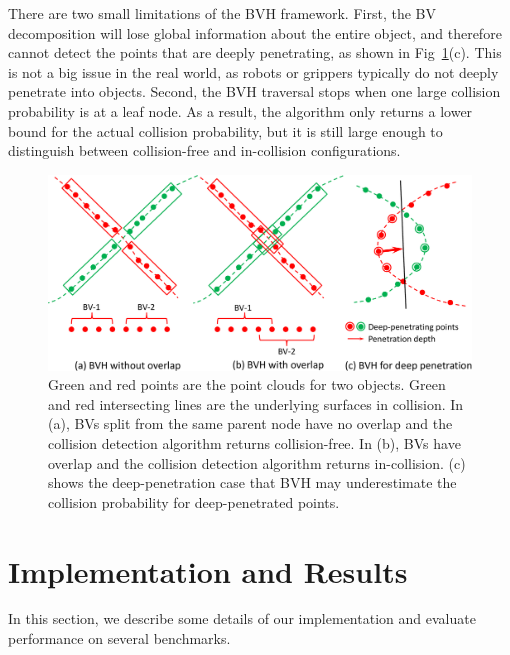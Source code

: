 There are two small limitations of the BVH framework. First, the BV decomposition will lose global information about the entire object, and therefore cannot detect the points that are deeply penetrating, as shown in Fig~\ref{fig:7:bvh_overlap}(c). This is not a big issue in the real world, as robots or grippers typically do not deeply penetrate into objects. Second, the BVH traversal stops when one large collision probability is at a leaf node.
As a result, the algorithm only returns a lower bound for the actual collision probability, but it is still large enough to distinguish between collision-free and in-collision configurations.

\begin{figure}[htb]
  \centering
  \includegraphics[width=0.9\linewidth]{figs/7/bvh_overlap.pdf}
  \caption[BVH acceleration for point-cloud collision]{\label{fig:7:bvh_overlap} Green and red points are the point clouds for two objects. Green and red intersecting lines are the underlying surfaces in collision. In (a), BVs split from the same parent node
  have no overlap and the collision detection algorithm returns collision-free. In (b), BVs have overlap and the collision detection algorithm returns in-collision. (c) shows the deep-penetration case that BVH may underestimate the collision probability for deep-penetrated points.}
\end{figure}


\section{Implementation and Results}
\label{sec:7:results}
In this section, we describe some details of our implementation and evaluate performance on several benchmarks.

